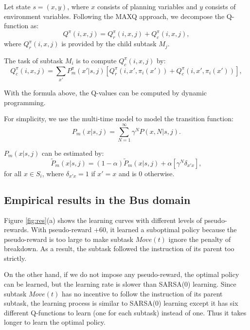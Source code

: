 Let state $s = (x, y)$, where $x$ consists of planning variables and $y$ consists of environment
variables. Following the MAXQ approach, we decompose the Q-function as:
\begin{equation}
    Q^{\pi}(i, x, j) = Q_r^{\pi}(i, x, j) + Q_c^{\pi}(i, x, j),
    \label{eq:biasedMaxQ}
\end{equation}
where $Q_r^{\pi}(i, x, j)$ is provided by the child subtask $M_j$.

The task of subtask $M_i$ is to compute $Q_c^{\pi}(i, x, j)$ by:
\begin{equation}
    Q_c^{\pi}(i, x, j) = \sum_{x'} P_m^{\pi}(x'|s, j)[Q_r^{\pi}(i, x', \pi_i(x')) + Q_c^{\pi}(i, x', \pi_i(x'))],
    \label{eq:biasedQc}
\end{equation}

With the formula above, the Q-values can be computed by dynamic programming.

For simplicity, we use the multi-time model \cite{SMDP} to model the transition function: 
\begin{equation}
    P_m(x|s, j) = \sum^{\infty}_{N=1} \gamma^N P(x, N|s, j).
    \label{eq:multiProb}
\end{equation}

$P_m(x|s, j)$ can be estimated by:
\begin{equation}
    \tilde{P}_m(x|s, j) = (1-\alpha)\tilde{P}_m(x|s, j) + \alpha [ \gamma^N \delta_{x'x}],
    \label{eq:approxP}
\end{equation}
for all $x \in S_i$, where $\delta_{x'x}=1$ if $x' = x$ and is 0 otherwise.

\subsection{Empirical results in the Bus domain}
\label{se:BusRes}
Figure \ref{fig:res}(a) shows the learning curves with different levels of pseudo-rewards.
With pseudo-reward $+60$, it learned a suboptimal policy because
the pseudo-reward is too large to make subtask $Move(t)$ ignore 
the penalty of breakdown. As a result, the subtask followed 
the instruction of its parent too strictly.

On the other hand, if we do not impose any pseudo-reward, 
the optimal policy can be learned, but the learning rate is
slower than SARSA(0) learning. Since subtask $Move(t)$ has no
incentive to follow the instruction of its parent subtask, 
the learning process is similar to SARSA(0) learning 
except it has six different Q-functions to learn (one for each subtask) instead of one.
Thus it takes longer to learn the optimal policy. 

